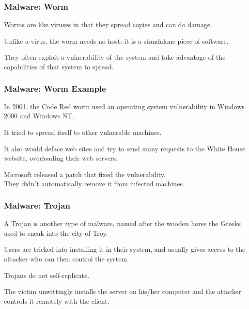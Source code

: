 \begin{frame}
\frametitle{Malware: Worm}
\begin{changemargin}{1cm}

Worms are like viruses in that they spread copies and can do damage.

Unlike a virus, the worm needs no host: it is a standalone piece of software. 

They often exploit a vulnerability of the system and take advantage of the capabilities of that system to spread.

\end{changemargin}
\end{frame}

\begin{frame}
\frametitle{Malware: Worm Example}
\begin{changemargin}{1cm}

In 2001, the Code Red worm used an operating system vulnerability in Windows 2000 and Windows NT. 

It tried to spread itself to other vulnerable machines.

It also would deface web sites and try to send many requests to the White House website, overloading their web servers. 

Microsoft released a patch that fixed the vulnerability.\\
\quad They  didn't automatically remove it from infected machines.
\end{changemargin}
\end{frame}


\begin{frame}
\frametitle{Malware: Trojan}
\begin{changemargin}{1cm}
A Trojan is another type of malware, named after the wooden horse the Greeks used to sneak into the city of Troy.

Users are tricked into installing it in their system, and usually gives access to the attacker who can then control the system. 

Trojans do not self-replicate.

The victim unwittingly installs the server on his/her computer and the attacker controls it remotely with the client.

\end{changemargin}
\end{frame}

